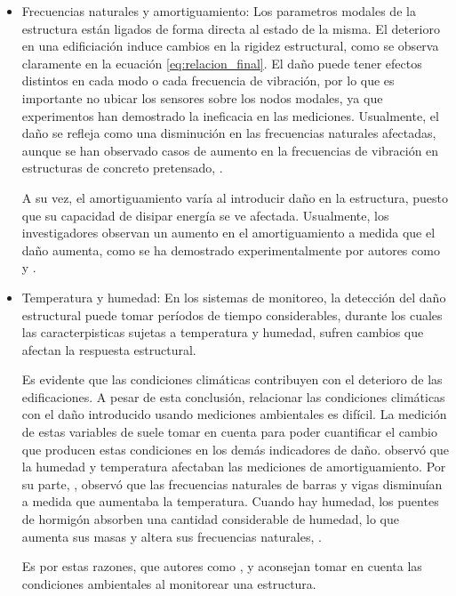     \begin{itemize}
        \item Frecuencias naturales y amortiguamiento: Los parametros modales de la estructura están ligados de forma directa al estado de la misma. El deterioro en una edificiación induce cambios en la rigidez estructural, como se observa claramente en la ecuación \ref{eq:relacion_final}. El daño puede tener efectos distintos en cada modo o cada frecuencia de vibración, por lo que es importante no ubicar los sensores sobre los nodos modales, ya que experimentos han demostrado la ineficacia en las mediciones. Usualmente, el daño se refleja como una disminución en las frecuencias naturales afectadas, aunque se han observado casos de aumento en la frecuencias de vibración en estructuras de concreto pretensado, \citep{rytter1993vibration}.
        
        A su vez, el amortiguamiento varía al introducir daño en la estructura, puesto que su capacidad de disipar energía se ve afectada. Usualmente, los investigadores observan un aumento en el amortiguamiento a medida que el daño aumenta, como se ha demostrado experimentalmente por autores como \citet{hearn1991modal} y \citet{rytter1993vibration}.

        \item Temperatura y humedad: En los sistemas de monitoreo, la detección del daño estructural puede tomar períodos de tiempo considerables, durante los cuales las caracterpisticas sujetas a temperatura y humedad, sufren cambios que afectan la respuesta estructural.
        
        
        
        Es evidente que las condiciones climáticas contribuyen con el deterioro de las edificaciones. A pesar de esta conclusión, relacionar las condiciones climáticas con el daño introducido usando mediciones ambientales es difícil. La medición de estas variables de suele tomar en cuenta para poder cuantificar el cambio que producen estas condiciones en los demás indicadores de daño. \citet{rytter1993vibration} observó que la humedad y temperatura afectaban las mediciones de amortiguamiento. Por su parte, \citet{mohamed2014}, observó que las frecuencias naturales de barras y vigas disminuían a medida que aumentaba la temperatura. Cuando hay humedad, los puentes de hormigón absorben una cantidad considerable de humedad, lo que aumenta sus masas y altera sus frecuencias naturales, \citep{sohn2007effects}.

        Es por estas razones, que autores como \citet{farrar2007introduction}, \citet{sohn2007effects} y \citet{mohamed2014} aconsejan tomar en cuenta las condiciones ambientales al monitorear una estructura.
        

\end{itemize}
